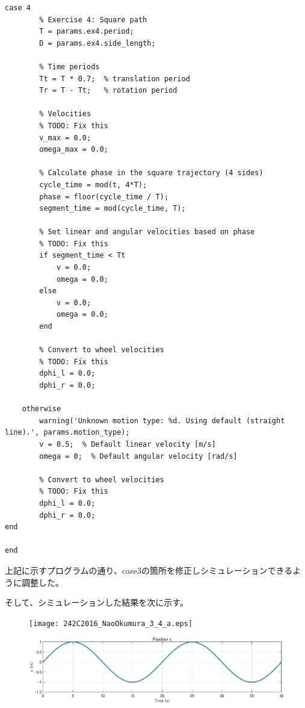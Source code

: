 \documentclass[10pt,a4paper,titlepage]{jreport} %
\begin{document}
\begin{lstlisting}[caption=modified＿mobile＿robot＿controller.m]
    case 4
        % Exercise 4: Square path
        T = params.ex4.period;
        D = params.ex4.side_length;
        
        % Time periods
        Tt = T * 0.7;  % translation period
        Tr = T - Tt;   % rotation period
        
        % Velocities
        % TODO: Fix this
        v_max = 0.0;
        omega_max = 0.0;
        
        % Calculate phase in the square trajectory (4 sides)
        cycle_time = mod(t, 4*T);
        phase = floor(cycle_time / T);
        segment_time = mod(cycle_time, T);
        
        % Set linear and angular velocities based on phase
        % TODO: Fix this
        if segment_time < Tt
            v = 0.0;
            omega = 0.0;
        else
            v = 0.0;
            omega = 0.0;
        end
        
        % Convert to wheel velocities
        % TODO: Fix this
        dphi_l = 0.0;
        dphi_r = 0.0;
        
    otherwise
        warning('Unknown motion type: %d. Using default (straight line).', params.motion_type);
        v = 0.5;  % Default linear velocity [m/s]
        omega = 0;  % Default angular velocity [rad/s]
        
        % Convert to wheel velocities
        % TODO: Fix this
        dphi_l = 0.0;
        dphi_r = 0.0;
end

end

\end{lstlisting}

上記に示すプログラムの通り、case3の箇所を修正しシミュレーションできるように調整した。

そして、シミュレーションした結果を次に示す。

\begin{figure}[H] %
  \centering
  \texttt{[image: 242C2016\_NaoOkumura\_3\_4\_a.eps]} %
\end{figure}

\begin{figure}[H] %
  \centering
  \includegraphics[width=0.6\linewidth]{242C2016_NaoOkumura_3_4_b.eps} %
\end{figure}
\end{document}
